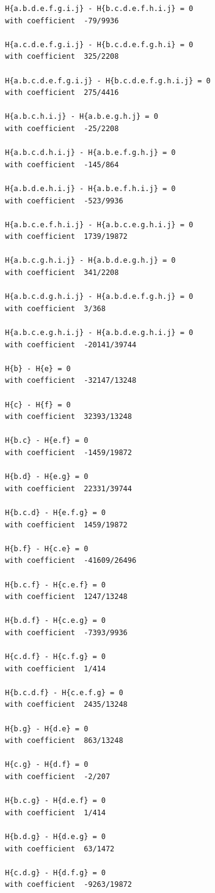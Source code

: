 \documentclass[11pt, a4paper]{kybernetika}
\begin{document}
\begin{verbatim}
		H{a.b.d.e.f.g.i.j} - H{b.c.d.e.f.h.i.j} = 0
		with coefficient  -79/9936
		
		H{a.c.d.e.f.g.i.j} - H{b.c.d.e.f.g.h.i} = 0
		with coefficient  325/2208
		
		H{a.b.c.d.e.f.g.i.j} - H{b.c.d.e.f.g.h.i.j} = 0
		with coefficient  275/4416
		
		H{a.b.c.h.i.j} - H{a.b.e.g.h.j} = 0
		with coefficient  -25/2208
		
		H{a.b.c.d.h.i.j} - H{a.b.e.f.g.h.j} = 0
		with coefficient  -145/864
		
		H{a.b.d.e.h.i.j} - H{a.b.e.f.h.i.j} = 0
		with coefficient  -523/9936
		
		H{a.b.c.e.f.h.i.j} - H{a.b.c.e.g.h.i.j} = 0
		with coefficient  1739/19872
		
		H{a.b.c.g.h.i.j} - H{a.b.d.e.g.h.j} = 0
		with coefficient  341/2208
		
		H{a.b.c.d.g.h.i.j} - H{a.b.d.e.f.g.h.j} = 0
		with coefficient  3/368
		
		H{a.b.c.e.g.h.i.j} - H{a.b.d.e.g.h.i.j} = 0
		with coefficient  -20141/39744
		
		H{b} - H{e} = 0
		with coefficient  -32147/13248
		
		H{c} - H{f} = 0
		with coefficient  32393/13248
		
		H{b.c} - H{e.f} = 0
		with coefficient  -1459/19872
		
		H{b.d} - H{e.g} = 0
		with coefficient  22331/39744
		
		H{b.c.d} - H{e.f.g} = 0
		with coefficient  1459/19872
		
		H{b.f} - H{c.e} = 0
		with coefficient  -41609/26496
		
		H{b.c.f} - H{c.e.f} = 0
		with coefficient  1247/13248
		
		H{b.d.f} - H{c.e.g} = 0
		with coefficient  -7393/9936
		
		H{c.d.f} - H{c.f.g} = 0
		with coefficient  1/414
		
		H{b.c.d.f} - H{c.e.f.g} = 0
		with coefficient  2435/13248
		
		H{b.g} - H{d.e} = 0
		with coefficient  863/13248
		
		H{c.g} - H{d.f} = 0
		with coefficient  -2/207
		
		H{b.c.g} - H{d.e.f} = 0
		with coefficient  1/414
		
		H{b.d.g} - H{d.e.g} = 0
		with coefficient  63/1472
		
		H{c.d.g} - H{d.f.g} = 0
		with coefficient  -9263/19872
		

\end{verbatim}
\end{document}
